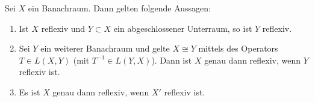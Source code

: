 \begin{thLemma} \label{vl17:lemma7.9}
    Sei $X$ ein Banachraum. Dann gelten folgende Aussagen:
    \begin{enumerate}[(1)]
        \item \label{vl17:lemma7.9:1}
            Ist $X$ reflexiv und $Y\subset X$ ein abgeschlossener Unterraum, so
            ist $Y$ reflexiv.
            
        \item \label{vl17:lemma7.9:2}
            Sei $Y$ ein weiterer Banachraum und gelte $X\cong Y$ mittels des
            Operators $T\in L(X,Y)$ (mit $T^{-1}\in L(Y,X)$). Dann ist $X$ genau
            dann reflexiv, wenn $Y$ reflexiv ist.
            
        \item \label{vl17:lemma7.9:3}
            Es ist $X$ genau dann reflexiv, wenn $X'$ reflexiv ist.
    \end{enumerate}
\end{thLemma}

